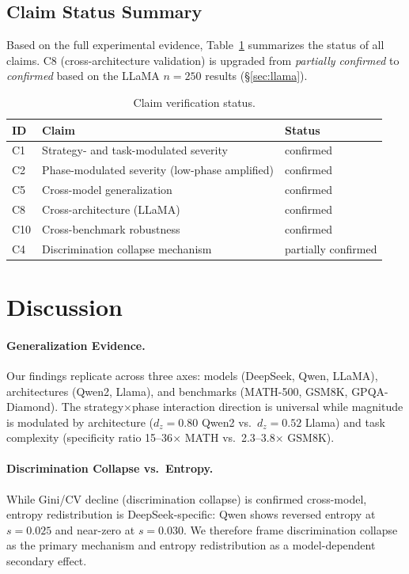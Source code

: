 \documentclass[11pt]{article}
\begin{document}
\subsection{Claim Status Summary}

Based on the full experimental evidence, Table~\ref{tab:claims} summarizes the status of all claims. C8 (cross-architecture validation) is upgraded from \emph{partially confirmed} to \emph{confirmed} based on the LLaMA $n=250$ results (\S\ref{sec:llama}).

\begin{table}[h]
\centering
\caption{Claim verification status.}
\label{tab:claims}
\begin{tabular}{lll}
\toprule
ID & Claim & Status \\
\midrule
C1 & Strategy- and task-modulated severity & confirmed \\
C2 & Phase-modulated severity (low-phase amplified) & confirmed \\
C5 & Cross-model generalization & confirmed \\
C8 & Cross-architecture (LLaMA) & confirmed \\
C10 & Cross-benchmark robustness & confirmed \\
C4 & Discrimination collapse mechanism & partially confirmed \\
\bottomrule
\end{tabular}
\end{table}

\section{Discussion}

\paragraph{Generalization Evidence.}
Our findings replicate across three axes: models (DeepSeek, Qwen, LLaMA), architectures (Qwen2, Llama), and benchmarks (MATH-500, GSM8K, GPQA-Diamond). The strategy$\times$phase interaction direction is universal while magnitude is modulated by architecture ($d_z=0.80$ Qwen2 vs.\ $d_z=0.52$ Llama) and task complexity (specificity ratio 15--36$\times$ MATH vs.\ 2.3--3.8$\times$ GSM8K).

\paragraph{Discrimination Collapse vs.\ Entropy.}
While Gini/CV decline (discrimination collapse) is confirmed cross-model, entropy redistribution is DeepSeek-specific: Qwen shows reversed entropy at $s=0.025$ and near-zero at $s=0.030$. We therefore frame discrimination collapse as the primary mechanism and entropy redistribution as a model-dependent secondary effect.
\end{document}

